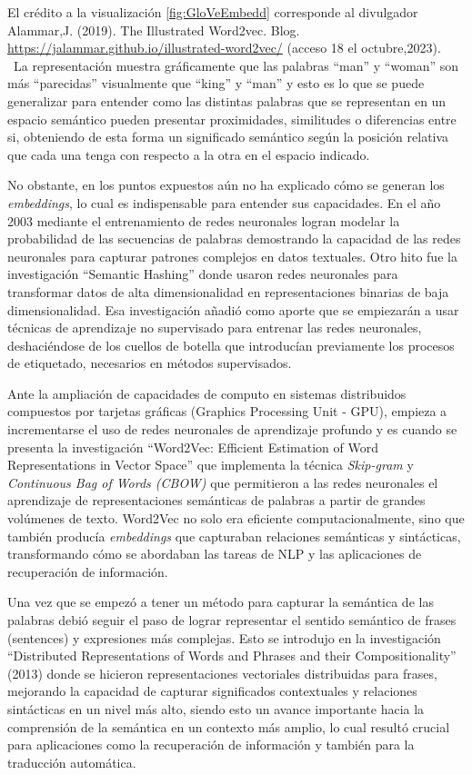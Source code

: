 \documentclass[
  10,
  openany]{book}
\begin{document}
El crédito a la visualización \ref{fig:GloVeEmbedd} corresponde al divulgador Alammar,J. (2019). The Illustrated Word2vec. Blog. \url{https://jalammar.github.io/illustrated-word2vec/} (acceso 18 el octubre,2023). ~La representación muestra gráficamente que las palabras ``man'' y ``woman'' son más ``parecidas'' visualmente que ``king'' y ``man'' y esto es lo que se puede generalizar para entender como las distintas palabras que se representan en un espacio semántico pueden presentar proximidades, similitudes o diferencias entre si, obteniendo de esta forma un significado semántico según la posición relativa que cada una tenga con respecto a la otra en el espacio indicado.

No obstante, en los puntos expuestos aún no ha explicado cómo se generan los \emph{embeddings}, lo cual es indispensable para entender sus capacidades. En el año 2003 mediante el entrenamiento de redes neuronales logran modelar la probabilidad de las secuencias de palabras demostrando la capacidad de las redes neuronales para capturar patrones complejos en datos textuales. Otro hito fue la investigación ``Semantic Hashing'' \citep{salakhutdinov2009} donde usaron redes neuronales para transformar datos de alta dimensionalidad en representaciones binarias de baja dimensionalidad. Esa investigación añadió como aporte que se empiezarán a usar técnicas de aprendizaje no supervisado para entrenar las redes neuronales, deshaciéndose de los cuellos de botella que introducían previamente los procesos de etiquetado, necesarios en métodos supervisados.

Ante la ampliación de capacidades de computo en sistemas distribuidos compuestos por tarjetas gráficas (Graphics Processing Unit - GPU), empieza a incrementarse el uso de redes neuronales de aprendizaje profundo y es cuando se presenta la investigación ``Word2Vec: Efficient Estimation of Word Representations in Vector Space'' \citep{mikolov2013} que implementa la técnica \emph{Skip-gram} y \emph{Continuous Bag of Words (CBOW)} que permitieron a las redes neuronales el aprendizaje de representaciones semánticas de palabras a partir de grandes volúmenes de texto. Word2Vec no solo era eficiente computacionalmente, sino que también producía \emph{embeddings} que capturaban relaciones semánticas y sintácticas, transformando cómo se abordaban las tareas de NLP y las aplicaciones de recuperación de información.

Una vez que se empezó a tener un método para capturar la semántica de las palabras debió seguir el paso de lograr representar el sentido semántico de frases (sentences) y expresiones más complejas. Esto se introdujo en la investigación ``Distributed Representations of Words and Phrases and their Compositionality'' (2013) \citep{mikolov2013a} donde se hicieron representaciones vectoriales distribuidas para frases, mejorando la capacidad de capturar significados contextuales y relaciones sintácticas en un nivel más alto, siendo esto un avance importante hacia la comprensión de la semántica en un contexto más amplio, lo cual resultó crucial para aplicaciones como la recuperación de información y también para la traducción automática.
\end{document}
